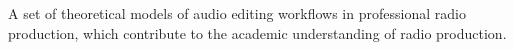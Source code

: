 














  A set of theoretical models of audio editing workflows in professional radio production, which
  contribute to the academic understanding of radio production.

